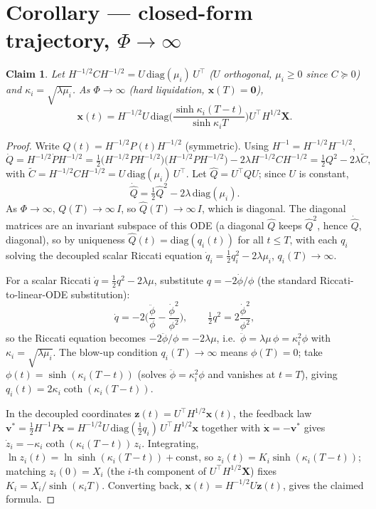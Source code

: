 \documentclass[11pt,a4paper]{article}
\newtheorem*{claim}{Claim}
\begin{document}
\section*{Corollary --- closed-form trajectory, $\Phi\to\infty$}

\begin{claim}
Let $H^{-1/2}CH^{-1/2}=U\,\mathrm{diag}(\mu_i)\,U^\top$ ($U$ orthogonal,
$\mu_i\ge0$ since $C\succeq0$) and $\kappa_i=\sqrt{\lambda\mu_i}$. As
$\Phi\to\infty$ (hard liquidation, $\mathbf x(T)=\mathbf 0$),
\[
\mathbf x(t)=H^{-1/2}U\,\mathrm{diag}\!\Big(\frac{\sinh\kappa_i(T-t)}
{\sinh\kappa_iT}\Big)U^\top H^{1/2}\mathbf X .
\]
\end{claim}

\begin{proof}
Write $Q(t)=H^{-1/2}P(t)H^{-1/2}$ (symmetric). Using $H^{-1}=H^{-1/2}H^{-1/2}$,
\[
\dot Q=H^{-1/2}\dot PH^{-1/2}=\tfrac12\big(H^{-1/2}PH^{-1/2}\big)
\big(H^{-1/2}PH^{-1/2}\big)-2\lambda H^{-1/2}CH^{-1/2}=\tfrac12Q^2-2\lambda
\tilde C,
\]
with $\tilde C=H^{-1/2}CH^{-1/2}=U\,\mathrm{diag}(\mu_i)\,U^\top$. Let
$\hat Q=U^\top QU$; since $U$ is constant,
\[
\dot{\hat Q}=\tfrac12\hat Q^2-2\lambda\,\mathrm{diag}(\mu_i).
\]
As $\Phi\to\infty$, $Q(T)\to\infty\, I$, so $\hat Q(T)\to\infty\,I$, which is
diagonal. The diagonal matrices are an invariant subspace of this ODE (a
diagonal $\hat Q$ keeps $\hat Q^2$, hence $\dot{\hat Q}$, diagonal), so by
uniqueness $\hat Q(t)=\mathrm{diag}(q_i(t))$ for all $t\le T$, with each
$q_i$ solving the decoupled scalar Riccati equation
$\dot q_i=\tfrac12q_i^2-2\lambda\mu_i$, $q_i(T)\to\infty$.

For a scalar Riccati $\dot q=\tfrac12q^2-2\lambda\mu$, substitute
$q=-2\dot\phi/\phi$ (the standard Riccati-to-linear-ODE substitution):
\[
\dot q=-2\Big(\frac{\ddot\phi}{\phi}-\frac{\dot\phi^2}{\phi^2}\Big),\qquad
\tfrac12q^2=2\frac{\dot\phi^2}{\phi^2},
\]
so the Riccati equation becomes $-2\ddot\phi/\phi=-2\lambda\mu$, i.e.\
$\ddot\phi=\lambda\mu\,\phi=\kappa_i^2\phi$ with $\kappa_i=\sqrt{\lambda\mu_i}$.
The blow-up condition $q_i(T)\to\infty$ means $\phi(T)=0$; take
$\phi(t)=\sinh(\kappa_i(T-t))$ (solves $\ddot\phi=\kappa_i^2\phi$ and
vanishes at $t=T$), giving $q_i(t)=2\kappa_i\coth(\kappa_i(T-t))$.

In the decoupled coordinates $\mathbf z(t)=U^\top H^{1/2}\mathbf x(t)$, the
feedback law $\mathbf v^*=\tfrac12H^{-1}P\mathbf x=H^{-1/2}U\,\mathrm{diag}
(\tfrac12q_i)\,U^\top H^{1/2}\mathbf x$ together with $\dot{\mathbf x}=
-\mathbf v^*$ gives $\dot z_i=-\kappa_i\coth(\kappa_i(T-t))\,z_i$. Integrating,
$\ln z_i(t)=\ln\sinh(\kappa_i(T-t))+\text{const}$, so $z_i(t)=K_i\sinh(\kappa_i
(T-t))$; matching $z_i(0)=X_i$ (the $i$-th component of $U^\top
H^{1/2}\mathbf X$) fixes $K_i=X_i/\sinh(\kappa_iT)$. Converting back,
$\mathbf x(t)=H^{-1/2}U\mathbf z(t)$, gives the claimed formula.
\end{proof}
\end{document}
